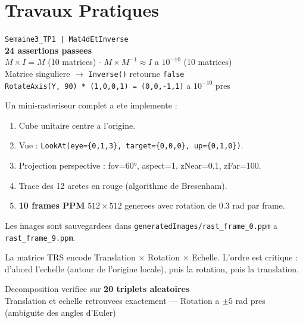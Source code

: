 \documentclass[12pt,a4paper]{report}
\newcommand{\code}[1]{\texttt{\textcolor{PrimaryBlue}{#1}}}
\begin{document}
\section{Travaux Pratiques}

\begin{tpbox}
\begin{resultbox}
\centering
\texttt{Semaine3\_TP1 | Mat4dEtInverse}\\[4pt]
\textbf{24 assertions passees}\\[2pt]
$M \times I = M$ (10 matrices) $\cdot$ $M \times M^{-1} \approx I$ a $10^{-10}$ (10 matrices) \\
Matrice singuliere $\to$ \code{Inverse()} retourne \texttt{false} \\
\code{RotateAxis(Y, 90\textdegree) * (1,0,0,1) = (0,0,-1,1)} a $10^{-10}$ pres
\end{resultbox}
\end{tpbox}

\begin{tpbox}
Un mini-rasteriseur complet a ete implemente :
\begin{enumerate}
  \item Cube unitaire centre a l'origine.
  \item Vue : \code{LookAt(eye=\{0,1,3\}, target=\{0,0,0\}, up=\{0,1,0\})}.
  \item Projection perspective : fov=60$°$, aspect=1, zNear=0.1, zFar=100.
  \item Trace des 12 aretes en rouge (algorithme de Bresenham).
  \item \textbf{10 frames PPM} $512\times512$ generees avec rotation de $0.3$ rad par frame.
\end{enumerate}
Les images sont sauvegardees dans \code{generatedImages/rast\_frame\_0.ppm} a \code{rast\_frame\_9.ppm}.
\end{tpbox}

\begin{tpbox}
La matrice TRS encode Translation $\times$ Rotation $\times$ Echelle. L'ordre est critique : d'abord l'echelle (autour de l'origine locale), puis la rotation, puis la translation.

\begin{resultbox}
\centering
Decomposition verifiee sur \textbf{20 triplets aleatoires}\\
Translation et echelle retrouvees exactement --- Rotation a $\pm5$ rad pres (ambiguite des angles d'Euler)
\end{resultbox}
\end{tpbox}
\end{document}
